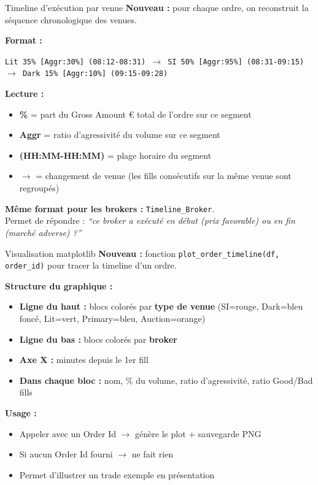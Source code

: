 \documentclass[10pt]{beamer}
\begin{document}
\begin{frame}{Timeline d'exécution par venue}
\textbf{Nouveau :} pour chaque ordre, on reconstruit la séquence chronologique des venues.

\vspace{0.3cm}
\textbf{Format :}
\begin{center}
\small
\texttt{Lit 35\% [Aggr:30\%] (08:12-08:31) $\rightarrow$ SI 50\% [Aggr:95\%] (08:31-09:15) $\rightarrow$ Dark 15\% [Aggr:10\%] (09:15-09:28)}
\end{center}

\vspace{0.3cm}
\textbf{Lecture :}
\begin{itemize}
    \item \textbf{\%} = part du Gross Amount \euro{} total de l'ordre sur ce segment
    \item \textbf{Aggr} = ratio d'agressivité du volume sur ce segment
    \item \textbf{(HH:MM-HH:MM)} = plage horaire du segment
    \item \textbf{$\rightarrow$} = changement de venue (les fills consécutifs sur la même venue sont regroupés)
\end{itemize}

\vspace{0.3cm}
\textbf{Même format pour les brokers :} \texttt{Timeline\_Broker}.\\
Permet de répondre : \textit{``ce broker a exécuté en début (prix favorable) ou en fin (marché adverse) ?''}
\end{frame}

\begin{frame}{Visualisation matplotlib}
\textbf{Nouveau :} fonction \texttt{plot\_order\_timeline(df, order\_id)} pour tracer la timeline d'un ordre.

\vspace{0.3cm}
\textbf{Structure du graphique :}
\begin{itemize}
    \item \textbf{Ligne du haut :} blocs colorés par \textbf{type de venue} (SI=rouge, Dark=bleu foncé, Lit=vert, Primary=bleu, Auction=orange)
    \item \textbf{Ligne du bas :} blocs colorés par \textbf{broker}
    \item \textbf{Axe X :} minutes depuis le 1er fill
    \item \textbf{Dans chaque bloc :} nom, \% du volume, ratio d'agressivité, ratio Good/Bad fills
\end{itemize}

\vspace{0.3cm}
\textbf{Usage :}
\begin{itemize}
    \item Appeler avec un Order Id $\rightarrow$ génère le plot + sauvegarde PNG
    \item Si aucun Order Id fourni $\rightarrow$ ne fait rien
    \item Permet d'illustrer un trade exemple en présentation
\end{itemize}
\end{frame}
\end{document}

